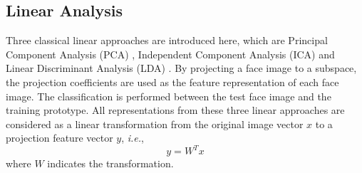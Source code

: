 \subsection{Linear Analysis}
Three classical linear approaches are introduced here, which are Principal Component Analysis (PCA) \cite{Turk1991}, Independent Component Analysis (ICA) \cite{Bartlett1998} and Linear Discriminant Analysis (LDA) \cite{Belhumeur1997,Swet1996}. By projecting a face image to a subspace, the projection coefficients are used as the feature representation of each face image. The classification is performed between the test face image and the training prototype. All representations from these three linear approaches are considered as a linear transformation from the original image vector $x$ to a projection feature vector $y$, \textit{i.e.},
\begin{equation}
 y = W^T x
\end{equation}
where $W$ indicates the transformation.
